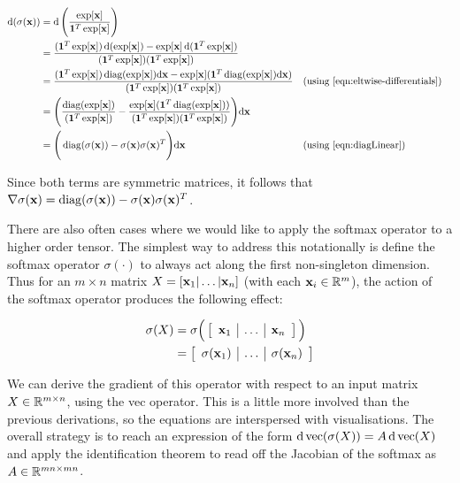 \begin{align}
  \operatorname{\text{d}}(\sigma(\mathbf{x})) &= \operatorname{\text{d}} \Bigg( \frac{\exp[\mathbf{x}]}{\mathbf{1}^T \exp[\mathbf{x}]} \Bigg) \\
                 &= \frac{(\mathbf{1}^T \exp[\mathbf{x}]) \operatorname{\text{d}} (\exp[\mathbf{x}]) - \exp[\mathbf{x}] \operatorname{\text{d}} (\mathbf{1}^T \exp[\mathbf{x}])}{(\mathbf{1}^T \exp[\mathbf{x}])(\mathbf{1}^T \exp[\mathbf{x}])} \\
                 &= \frac{(\mathbf{1}^T \exp[\mathbf{x}]) \operatorname{diag}(\exp[\mathbf{x}]){\operatorname{\text{d}}} \mathbf{x} - \exp[\mathbf{x}] (\mathbf{1}^T \operatorname{diag}(\exp[\mathbf{x}]){\operatorname{\text{d}}}\mathbf{x})}{(\mathbf{1}^T \exp[\mathbf{x}])(\mathbf{1}^T \exp[\mathbf{x}])} && \text{(using \ref{eqn:eltwise-differentials})}\\
                 &= \Bigg(\frac{\operatorname{diag}(\exp[\mathbf{x}])}{(\mathbf{1}^T \exp[\mathbf{x}])} - \frac{\exp[\mathbf{x}] (\mathbf{1}^T \operatorname{diag}(\exp[\mathbf{x}]))}{(\mathbf{1}^T \exp[\mathbf{x}])(\mathbf{1}^T \exp[\mathbf{x}])}\Bigg){\operatorname{\text{d}}}\mathbf{x} \\
                  &= \Bigg(\operatorname{diag}(\sigma(\mathbf{x})) - \sigma(\mathbf{x})\sigma(\mathbf{x})^T\Bigg){\operatorname{\text{d}}}\mathbf{x} && \text{(using \ref{eqn:diagLinear})} \label{eqn:vectorSoftmax}
\end{align}

Since both terms are symmetric matrices, it follows that $\nabla\sigma(\mathbf{x}) = \operatorname{diag}(\sigma(\mathbf{x})) - \sigma(\mathbf{x})\sigma(\mathbf{x})^T$.  

There are also often cases where we would like to apply the softmax operator to a higher order tensor.  The simplest way to address this notationally is define the softmax operator $\sigma(\cdot)$ to always act along the first non-singleton dimension. Thus for an $m \times n$ matrix $X = [\mathbf{x}_1 | \dots | \mathbf{x}_n]$ (with each $\mathbf{x}_i \in \mathbb{R}^m$), the action of the softmax operator produces the following effect:

\begin{align*}
  \sigma(X) &= \sigma \Big( \left[\begin{array}{c|c|c}
  \mathbf{x}_1 & \dots & \mathbf{x}_n
\end{array}\right] \Big) \\
 &= \left[\begin{array}{c|c|c}
  \sigma(\mathbf{x}_1) & \dots & \sigma(\mathbf{x}_n)
\end{array}\right]
\end{align*}

We can derive the gradient of this operator with respect to an input matrix $X \in \mathbb{R}^{m \times n}$, using the vec operator. This is a little more involved than the previous derivations, so the equations are interspersed with visualisations.  The overall strategy is to reach an expression of the form $\operatorname{\text{d}} \operatorname{vec}(\sigma(X)) = A \operatorname{\text{d}} \operatorname{vec}(X)$ and apply the identification theorem \cite{magnus1988matrix} to read off the Jacobian of the softmax as $A \in \mathbb{R}^{mn \times mn}$.

